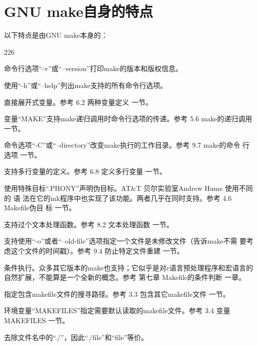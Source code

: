 \section{GNU make自身的特点}

以下特点是由GNU make本身的：

\begin{dinglist}{226}
\itemsep=4pt

\item 命令行选项“-v”或“--version”打印make的版本和版权信息。

\item 使用“-h”或“--help”列出make支持的所有命令行选项。

\item 直接展开式变量。参考 6.2 两种变量定义 一节。

\item 变量“MAKE”支持make递归调用时命令行选项的传递。参考  5.6 make的递归调用
    一节。

\item  命令选项“-C”或“--directory”改变make执行的工作目录。参考 9.7 make的命令
    行选项 一节。

\item 支持多行变量的定义。参考 6.8 定义多行变量 一节。

\item 使用特殊目标“.PHONY”声明伪目标。AT\&T 贝尔实验室Andrew Hume 使用不同的
    语
    法在它的mk程序中也实现了该功能。两者几乎在同时支持。参考 4.6 Makefile伪目
    标 一节。

\item 支持过个文本处理函数。参考 8.2 文本处理函数 一节。

\item 支持使用“-o”或者“--old-file”选项指定一个文件是未修改文件（告诉make不需
    要考虑这个文件的时间戳）。参考 9.4 防止特定文件重建 一节。

\item 条件执行。众多其它版本的make也支持；它似乎是对c语言预处理程序和宏语言的
    自然扩展，不能算是一个全新的概念。参考 第七章 Makefile的条件判断 一章。

\item 指定包含makefile文件的搜寻路径。参考 3.3 包含其它makefile文件 一节。

\item 环境变量“MAKEFILES”指定需要默认读取的makefile文件。参考 3.4 变量
    MAKEFILES 一节。

\item 去除文件名中的“./”，因此“./file”和“file”等价。


\end{dinglist}
